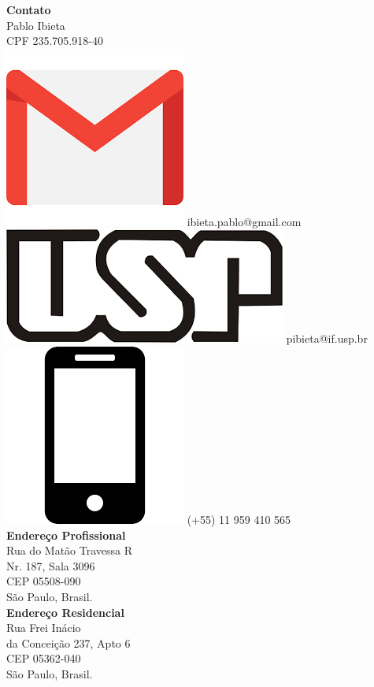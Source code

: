 \documentclass[a4paper,12pt,final]{memoir}
\begin{document}
\begin{flushleft}\small
    \vspace{10mm}
    \textbf{Contato}\\
    \vspace{1mm}
	Pablo Ibieta\\
	\vspace{1mm}
	CPF 235.705.918-40 \\
	\vspace{1mm}
    \includegraphics[width=0.07\columnwidth]{gmail_icon.png} ibieta.pablo@gmail.com \\
    \vspace{1mm}
    \includegraphics[width=0.08\columnwidth]{usp_icon.png} pibieta@if.usp.br \\
    \includegraphics[width=0.07\columnwidth]{cellphone_icon.png} (+55) 11 959 410 565 \\	
	\vspace{4mm}
	\textbf{Endereço Profissional}\\
	\vspace{1mm}
	Rua do Mat\~ao Travessa R\\
	\vspace{1mm}
	Nr. 187, Sala 3096 \\
	\vspace{1mm}
	CEP 05508-090\\
	\vspace{1mm}
	S\~{a}o Paulo, Brasil.\\
	\vspace{4mm}
	\textbf{Endereço Residencial}\\
	\vspace{1mm}
	Rua Frei In\'{a}cio \\
	\vspace{1mm}
	da Concei\c{c}\~{a}o 237, Apto 6 \\
	\vspace{1mm}
	CEP 05362-040 \\
	\vspace{1mm}
	S\~{a}o Paulo, Brasil.\\
	\vspace{4mm}

\end{flushleft}
\end{document}
